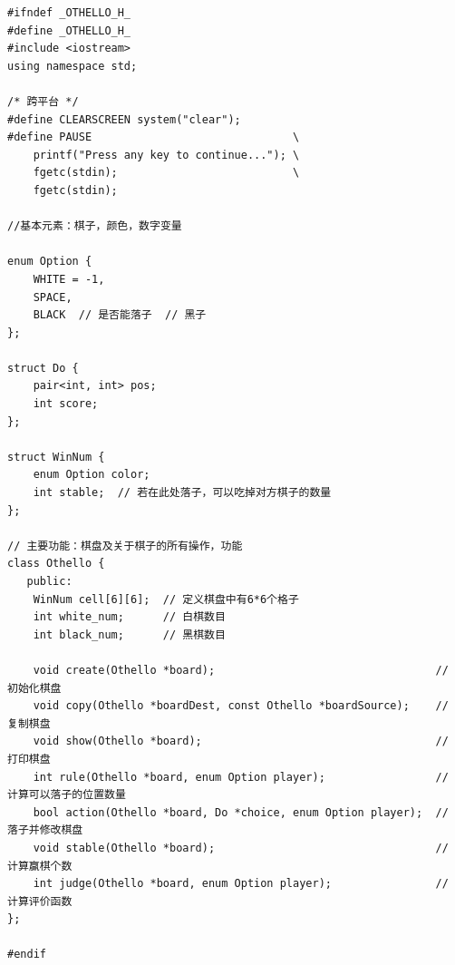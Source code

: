 \documentclass[a4paper, 11pt]{article}
\begin{document}
\begin{lstlisting}[title=Othello.h]
#ifndef _OTHELLO_H_
#define _OTHELLO_H_
#include <iostream>
using namespace std;

/* 跨平台 */
#define CLEARSCREEN system("clear");
#define PAUSE                               \
    printf("Press any key to continue..."); \
    fgetc(stdin);                           \
    fgetc(stdin);

//基本元素：棋子，颜色，数字变量

enum Option {
    WHITE = -1,
    SPACE,
    BLACK  // 是否能落子  // 黑子
};

struct Do {
    pair<int, int> pos;
    int score;
};

struct WinNum {
    enum Option color;
    int stable;  // 若在此处落子，可以吃掉对方棋子的数量
};

// 主要功能：棋盘及关于棋子的所有操作，功能
class Othello {
   public:
    WinNum cell[6][6];  // 定义棋盘中有6*6个格子
    int white_num;      // 白棋数目
    int black_num;      // 黑棋数目

    void create(Othello *board);                                  // 初始化棋盘
    void copy(Othello *boardDest, const Othello *boardSource);    // 复制棋盘
    void show(Othello *board);                                    // 打印棋盘
    int rule(Othello *board, enum Option player);                 // 计算可以落子的位置数量
    bool action(Othello *board, Do *choice, enum Option player);  // 落子并修改棋盘
    void stable(Othello *board);                                  // 计算赢棋个数
    int judge(Othello *board, enum Option player);                // 计算评价函数
};

#endif
\end{lstlisting}
\end{document}
